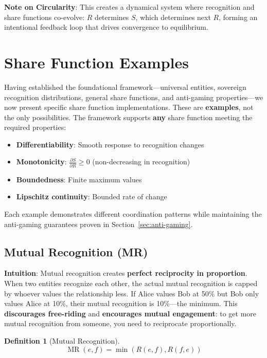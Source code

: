 \documentclass[11pt,a4paper]{article}
\theoremstyle{definition}
\newtheorem{definition}[theorem]{Definition}
\theoremstyle{remark}
\DeclareMathOperator{\MR}{MR}
\begin{document}
\textbf{Note on Circularity}: This creates a dynamical system where recognition and share functions co-evolve: $R$ determines $S$, which determines next $R$, forming an intentional feedback loop that drives convergence to equilibrium.

\section{Share Function Examples}
\label{sec:share-examples}

Having established the foundational framework---universal entities, sovereign recognition distributions, general share functions, and anti-gaming properties---we now present specific share function implementations. These are \textbf{examples}, not the only possibilities. The framework supports \textbf{any} share function meeting the required properties:
\begin{itemize}
\item \textbf{Differentiability}: Smooth response to recognition changes
\item \textbf{Monotonicity}: $\frac{\partial S}{\partial R} \ge 0$ (non-decreasing in recognition)
\item \textbf{Boundedness}: Finite maximum values
\item \textbf{Lipschitz continuity}: Bounded rate of change
\end{itemize}

Each example demonstrates different coordination patterns while maintaining the anti-gaming guarantees proven in Section~\ref{sec:anti-gaming}.

\subsection{Mutual Recognition (MR)}

\textbf{Intuition}: Mutual recognition creates \textbf{perfect reciprocity in proportion}. When two entities recognize each other, the actual mutual recognition is capped by whoever values the relationship less. If Alice values Bob at 50\% but Bob only values Alice at 10\%, their mutual recognition is 10\%---the minimum. This \textbf{discourages free-riding} and \textbf{encourages mutual engagement}: to get more mutual recognition from someone, you need to reciprocate proportionally.

\begin{definition}[Mutual Recognition]
\[ \MR(e,f) = \min(R(e,f), R(f,e)) \]
\end{definition}
\end{document}
